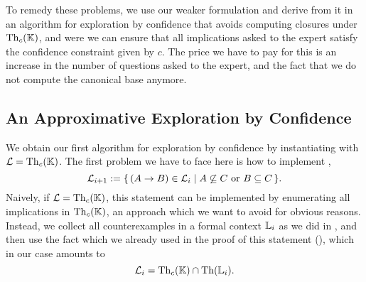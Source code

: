 To remedy these problems, we use our weaker formulation
 and derive from it in
 an algorithm for exploration by confidence that avoids computing
closures under $\operatorname{Th}_{c}({\mathbb{K}})$, and were we can ensure that all implications asked to
the expert satisfy the confidence constraint given by $c$.  The price we have to pay for
this is an increase in the number of questions asked to the expert, and the fact that we
do not compute the canonical base anymore.

\subsection{An Approximative Exploration by Confidence}
\label{sec:expl-conf-1}

We obtain our first algorithm for exploration by confidence by instantiating
 with $\mathcal{L} = \operatorname{Th}_{c}({\mathbb{K}})$.  The first problem
we have to face here is how to implement , \ie
\begin{equation*}
  \mathcal{L}_{i+1} := {\{\, (A \to B) \in \mathcal{L}_{i} \mid A \not\subseteq C \text{
      or } B \subseteq C \,\}}.
\end{equation*}
Naively, if $\mathcal{L} = \operatorname{Th}_{c}({\mathbb{K}})$, this statement can be implemented by
enumerating all implications in $\operatorname{Th}_{c}({\mathbb{K}})$, an approach which we want to avoid for
obvious reasons.  Instead, we collect all counterexamples in a formal context ${\mathbb{L}}_{i}$
as we did in , and then use the
fact which we already used in the proof of this statement (), which in our
case amounts to
\begin{equation*}
  \mathcal{L}_{i} = \operatorname{Th}_{c}({\mathbb{K}}) \cap \operatorname{Th}({\mathbb{L}}_{i}).
\end{equation*}


